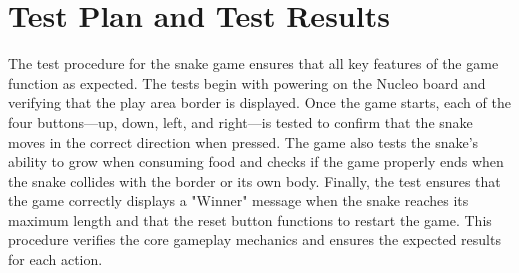 \section{Test Plan and Test Results}
\label{sec:test}

The test procedure for the snake game ensures that all key features of the game function as expected. The tests begin with powering on the Nucleo board and verifying that the play area border is displayed. Once the game starts, each of the four buttons—up, down, left, and right—is tested to confirm that the snake moves in the correct direction when pressed. The game also tests the snake’s ability to grow when consuming food and checks if the game properly ends when the snake collides with the border or its own body. Finally, the test ensures that the game correctly displays a "Winner" message when the snake reaches its maximum length and that the reset button functions to restart the game. This procedure verifies the core gameplay mechanics and ensures the expected results for each action.

